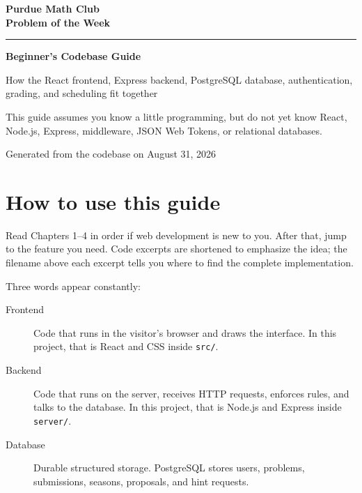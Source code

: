 \documentclass[11pt,oneside]{book}
\newcommand{\file}[1]{\texttt{#1}}
\begin{document}
\begin{titlepage}
  \pagecolor{cream}
  \color{ink}
  \centering
  \vspace*{1.2in}
  {\sffamily\bfseries\fontsize{38}{44}\selectfont Purdue Math Club\\[0.2em]Problem of the Week\par}
  \vspace{0.45in}
  {\color{purduegold}\rule{0.72\textwidth}{3pt}\par}
  \vspace{0.45in}
  {\sffamily\bfseries\fontsize{27}{32}\selectfont Beginner's Codebase Guide\par}
  \vspace{0.25in}
  {\Large How the React frontend, Express backend, PostgreSQL database, authentication, grading, and scheduling fit together\par}
  \vfill
  \begin{tcolorbox}[width=0.78\textwidth,colback=white,colframe=purduegold,boxrule=0.7pt,arc=2pt]
  \centering This guide assumes you know a little programming, but do not yet know React, Node.js, Express, middleware, JSON Web Tokens, or relational databases.
  \end{tcolorbox}
  \vfill
  {\large Generated from the codebase on August 31, 2026\par}
  \vspace{0.6in}
\end{titlepage}
\nopagecolor

\frontmatter
\tableofcontents

\chapter*{How to use this guide}
Read Chapters 1--4 in order if web development is new to you. After that, jump to the feature you need. Code excerpts are shortened to emphasize the idea; the filename above each excerpt tells you where to find the complete implementation.

Three words appear constantly:
\begin{description}
  \item[Frontend] Code that runs in the visitor's browser and draws the interface. In this project, that is React and CSS inside \file{src/}.
  \item[Backend] Code that runs on the server, receives HTTP requests, enforces rules, and talks to the database. In this project, that is Node.js and Express inside \file{server/}.
  \item[Database] Durable structured storage. PostgreSQL stores users, problems, submissions, seasons, proposals, and hint requests.
\end{description}
\end{document}
